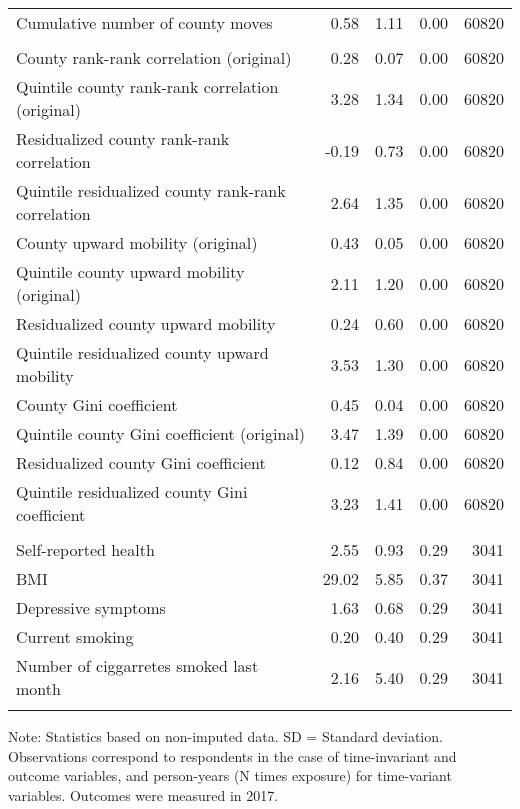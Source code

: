 \begin{table}[htp]
\begin{threeparttable}
\begin{tabular}{lrrrr}
  \quad Cumulative number of county moves & 0.58 & 1.11 & 0.00 & 60820 \\ 
   \addlinespace
\multicolumn{7}{l}{\textit{Exposure variables}} \\
\addlinespace
\quad County rank-rank correlation (original) & 0.28 & 0.07 & 0.00 & 60820 \\ 
  \quad Quintile county rank-rank correlation (original) & 3.28 & 1.34 & 0.00 & 60820 \\ 
  \quad Residualized county rank-rank correlation & -0.19 & 0.73 & 0.00 & 60820 \\ 
  \quad Quintile residualized county rank-rank correlation & 2.64 & 1.35 & 0.00 & 60820 \\ 
  \quad County upward mobility (original) & 0.43 & 0.05 & 0.00 & 60820 \\ 
  \quad Quintile county upward mobility (original) & 2.11 & 1.20 & 0.00 & 60820 \\ 
  \quad Residualized county upward mobility & 0.24 & 0.60 & 0.00 & 60820 \\ 
  \quad Quintile residualized county upward mobility & 3.53 & 1.30 & 0.00 & 60820 \\ 
  \quad County Gini coefficient & 0.45 & 0.04 & 0.00 & 60820 \\ 
  \quad Quintile county Gini coefficient (original) & 3.47 & 1.39 & 0.00 & 60820 \\ 
  \quad Residualized county Gini coefficient & 0.12 & 0.84 & 0.00 & 60820 \\ 
  \quad Quintile residualized county Gini coefficient & 3.23 & 1.41 & 0.00 & 60820 \\ 
   \addlinespace
\multicolumn{7}{l}{\textit{Outcomes}} \\
\addlinespace
\quad Self-reported health & 2.55 & 0.93 & 0.29 & 3041 \\ 
  \quad BMI & 29.02 & 5.85 & 0.37 & 3041 \\ 
  \quad Depressive symptoms & 1.63 & 0.68 & 0.29 & 3041 \\ 
  \quad Current smoking & 0.20 & 0.40 & 0.29 & 3041 \\ 
  \quad Number of ciggarretes smoked last month & 2.16 & 5.40 & 0.29 & 3041 \\ 
   \addlinespace
\hline
\addlinespace
\end{tabular}
\begin{tablenotes}
\scriptsize
\item Note: Statistics based on non-imputed data. SD = Standard deviation. Observations correspond to respondents in the case of time-invariant and outcome variables, and person-years (N times exposure) for time-variant variables. Outcomes were measured in 2017.
\end{tablenotes}
\end{threeparttable}
\end{table}
